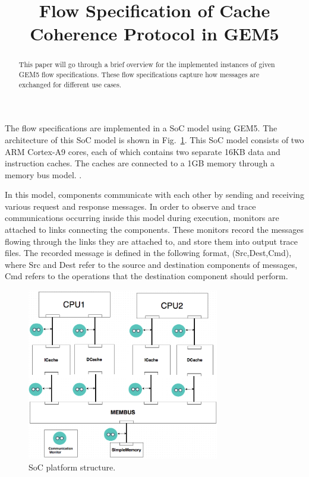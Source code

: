 \documentclass[conference]{IEEEtran}
\begin{document}
\title{Flow Specification of Cache Coherence Protocol in GEM5}

\maketitle


\begin{abstract}
This paper will go through a brief overview for the implemented instances of given GEM5 flow specifications. These flow specifications capture how messages are exchanged for different use cases. 
\end{abstract}

The flow specifications are implemented in a SoC model using GEM5. The architecture of this SoC model is shown in Fig.~\ref{SoC}. This SoC model consists of two ARM Cortex-A9 cores, each of which contains two separate 16KB data and instruction caches.  The caches are connected to a 1GB memory through a memory bus model.  .  

In this model, components communicate with each other by sending and receiving various request and response messages.  In order to observe and trace communications occurring inside this model during execution, monitors are attached to links connecting the components. These monitors record the messages flowing through the links they are attached to, and store them into output trace files. The recorded message is defined in the following format, (Src,Dest,Cmd), where Src and Dest refer to the source and destination components of messages, Cmd refers to the operations that the destination component should perform. 

\begin{figure} 
\centerline{
\includegraphics[width=3.3in]{figures/Fig4.png}}
\caption{SoC platform structure.}
\label{SoC}
\end{figure}
\end{document}
